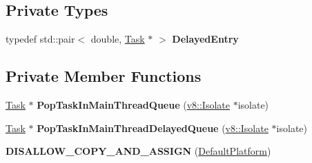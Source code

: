 \subsection*{Private Types}
\begin{DoxyCompactItemize}
\item 
typedef std\+::pair$<$ double, \hyperlink{classv8_1_1_task}{Task} $\ast$ $>$ {\bfseries Delayed\+Entry}\hypertarget{classv8_1_1platform_1_1_default_platform_a2d1cf33102fb0e61b06e0053afc8415d}{}\label{classv8_1_1platform_1_1_default_platform_a2d1cf33102fb0e61b06e0053afc8415d}

\end{DoxyCompactItemize}
\subsection*{Private Member Functions}
\begin{DoxyCompactItemize}
\item 
\hyperlink{classv8_1_1_task}{Task} $\ast$ {\bfseries Pop\+Task\+In\+Main\+Thread\+Queue} (\hyperlink{classv8_1_1_isolate}{v8\+::\+Isolate} $\ast$isolate)\hypertarget{classv8_1_1platform_1_1_default_platform_a24711955ff86eb1201f425862c846e1e}{}\label{classv8_1_1platform_1_1_default_platform_a24711955ff86eb1201f425862c846e1e}

\item 
\hyperlink{classv8_1_1_task}{Task} $\ast$ {\bfseries Pop\+Task\+In\+Main\+Thread\+Delayed\+Queue} (\hyperlink{classv8_1_1_isolate}{v8\+::\+Isolate} $\ast$isolate)\hypertarget{classv8_1_1platform_1_1_default_platform_aa9c4fe029127a7dde02cb542bd2eafe2}{}\label{classv8_1_1platform_1_1_default_platform_aa9c4fe029127a7dde02cb542bd2eafe2}

\item 
{\bfseries D\+I\+S\+A\+L\+L\+O\+W\+\_\+\+C\+O\+P\+Y\+\_\+\+A\+N\+D\+\_\+\+A\+S\+S\+I\+GN} (\hyperlink{classv8_1_1platform_1_1_default_platform}{Default\+Platform})\hypertarget{classv8_1_1platform_1_1_default_platform_aa9007648de97708bf27a7ed873f54771}{}\label{classv8_1_1platform_1_1_default_platform_aa9007648de97708bf27a7ed873f54771}

\end{DoxyCompactItemize}
